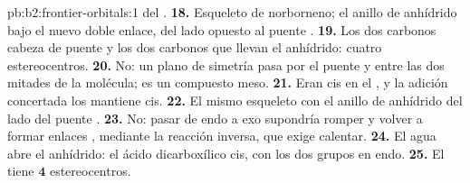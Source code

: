 \begin{solution}{pb:b2:frontier-orbitals:1}
 del .
\textbf{18.} Esqueleto de norborneno; el anillo de anhídrido bajo el nuevo doble enlace, del lado opuesto al
puente .
\textbf{19.} Los dos carbonos cabeza de puente y los dos carbonos que llevan el anhídrido: cuatro
estereocentros.
\textbf{20.} No: un plano de simetría pasa por el puente  y entre las dos mitades
de la molécula; es un compuesto meso.
\textbf{21.} Eran cis en el , y la adición concertada los mantiene cis.
\textbf{22.} El mismo esqueleto con el anillo de anhídrido del lado del puente .
\textbf{23.} No: pasar de endo a exo supondría romper y volver a formar enlaces , mediante
la reacción inversa, que exige calentar.
\textbf{24.} El agua abre el anhídrido: el ácido dicarboxílico cis, con los dos grupos  en endo.
\textbf{25.} El  tiene $\boldsymbol{4}$ estereocentros.
\end{solution}
